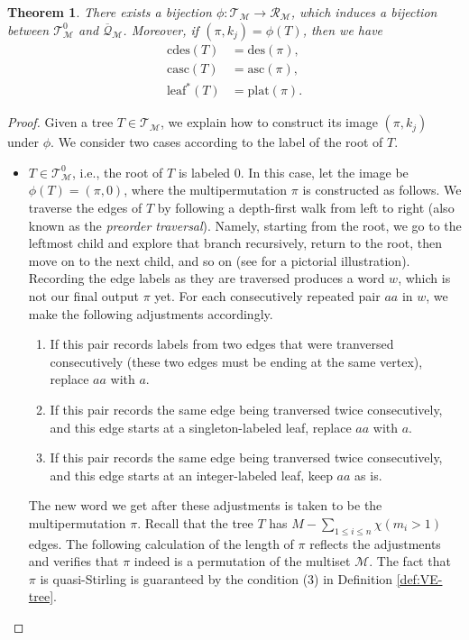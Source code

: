 \documentclass[11pt,reqno]{amsart}
\numberwithin{equation}{section}
\theoremstyle{plain}
\newtheorem{theorem}{Theorem}[section]
\theoremstyle{definition}
\newcommand{\bQ}{\overline{\mathcal{Q}}}
\newcommand{\M}{\mathcal{M}}
\newcommand{\T}{\mathcal{T}}
\newcommand{\R}{\mathcal{R}}
\def\des{\mathrm{des}}
\def\asc{\mathrm{asc}}
\def\cdes{\mathrm{cdes}}
\def\casc{\mathrm{casc}}
\def\plat{\mathrm{plat}}
\def\lleaf{\mathrm{leaf}^*}
\begin{document}
\begin{theorem}\label{thm:bijTtoR}
There exists a bijection $\phi: \T_{\M}\rightarrow \R_{\M}$, which induces a bijection between $\T_{\M}^0$ and $\bQ_{\M}$. Moreover, if $(\pi,k_j)=\phi(T)$, then we have
\begin{align}
\label{cdes=des}\cdes(T) &=\des(\pi),\\
\label{casc=asc}\casc(T) &=\asc(\pi),\\
\label{lleaf=plat}\lleaf(T) &=\plat(\pi).
\end{align}
\end{theorem}
\begin{proof}
Given a tree $T\in\T_{\M}$, we explain how to construct its image $(\pi,k_j)$ under $\phi$. We consider two cases according to the label of the root of $T$.
\begin{itemize}
	\item[Case I.\phantom{I}] $T\in\T_{\M}^0$, i.e., the root of $T$ is labeled $0$. In this case, let the image be $\phi(T)=(\pi,0)$, where the multipermutation $\pi$ is constructed as follows. We traverse the edges of $T$ by following a depth-first walk from left to right (also known as the {\em preorder traversal}). Namely, starting from the root, we go to the leftmost child and explore that branch recursively, return to the root, then move on to the next child, and so on (see \cite[Fig.~5-14]{Sta} for a pictorial illustration). Recording the edge labels as they are traversed produces a word $w$, which is not our final output $\pi$ yet. For each consecutively repeated pair $aa$ in $w$, we make the following adjustments accordingly.
	\begin{enumerate}[i]
		\item If this pair records labels from two edges that were tranversed consecutively (these two edges must be ending at the same vertex), replace $aa$ with $a$.
		\item If this pair records the same edge being tranversed twice consecutively, and this edge starts at a singleton-labeled leaf, replace $aa$ with $a$.
		\item If this pair records the same edge being tranversed twice consecutively, and this edge starts at an integer-labeled leaf, keep $aa$ as is.
	\end{enumerate}
	The new word we get after these adjustments is taken to be the multipermutation $\pi$. Recall that the tree $T$ has $M-\sum_{1\le i\le n}\chi(m_i>1)$ edges. The following calculation of the length of $\pi$ reflects the adjustments and verifies that $\pi$ indeed is a permutation of the multiset $\M$. The fact that $\pi$ is quasi-Stirling is guaranteed by the condition (3) in Definition \ref{def:VE-tree}.

\end{itemize}
\end{proof}
\end{document}
